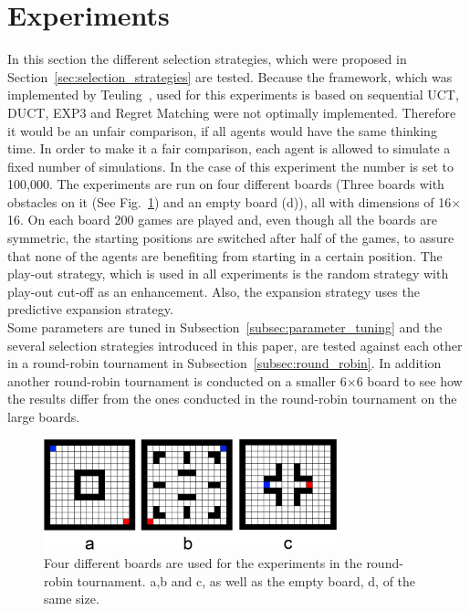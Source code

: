 \documentclass{article}
\begin{document}
\section{Experiments}
\label{sec:experiments}
In this section the different selection strategies, which were proposed in Section~\ref{sec:selection_strategies} are tested. Because the framework, which was implemented by Teuling~\cite{teuling_tron}, used for this experiments is based on sequential UCT, DUCT, EXP3 and Regret Matching were not optimally implemented. Therefore it would be an unfair comparison, if all agents would have the same thinking time. In order to make it a fair comparison, each agent is allowed to simulate a fixed number of simulations. In the case of this experiment the number is set to 100,000. The experiments are run on four different boards (Three boards with obstacles on it (See Fig.~\ref{fig:ex_boards}) and an empty board (d)), all with dimensions of 16$\times$16. On each board 200 games are played and, even though all the boards are symmetric, the starting positions are switched after half of the games, to assure that none of the agents are benefiting from starting in a certain position. The play-out strategy, which is used in all experiments is the random strategy with play-out cut-off as an enhancement. Also, the expansion strategy uses the predictive expansion strategy.\\
Some parameters are tuned in Subsection~\ref{subsec:parameter_tuning} and the several selection strategies introduced in this paper, are tested against each other in a round-robin tournament in Subsection~\ref{subsec:round_robin}. In addition another round-robin tournament is conducted on a smaller 6$\times$6 board to see how the results differ from the ones conducted in the round-robin tournament on the large boards.

\begin{figure}[t]
\begin{center}
\includegraphics[width=8.5cm]{images/boards.png}
\caption{Four different boards are used for the experiments in the round-robin tournament. a,b and c, as well as the empty board, d, of the same size.\label{fig:ex_boards}}
\end{center}
\end{figure}
\end{document}
